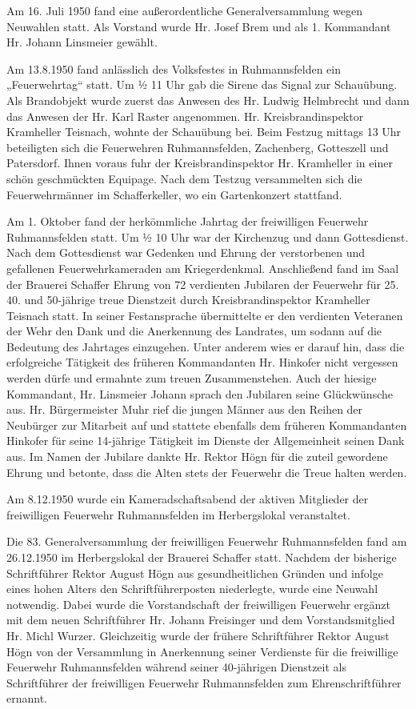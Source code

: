 \documentclass[12pt,a4paper]{book}
\begin{document}
Am 16. Juli 1950 fand eine außerordentliche Generalversammlung wegen Neuwahlen
statt. Als Vorstand wurde Hr. Josef Brem und als 1. Kommandant Hr. Johann
Linsmeier gewählt.

Am 13.8.1950 fand anlässlich des Volksfestes in Ruhmannsfelden ein
„Feuerwehrtag“ statt. Um ½ 11 Uhr gab die Sirene das Signal zur Schauübung. Als
Brandobjekt wurde zuerst das Anwesen des Hr. Ludwig Helmbrecht und dann das
Anwesen der Hr. Karl Raster angenommen. Hr. Kreisbrandinspektor Kramheller
Teisnach, wohnte der Schauübung bei. Beim Festzug mittags 13 Uhr beteiligten
sich die Feuerwehren Ruhmannsfelden, Zachenberg, Gotteszell und Patersdorf.
Ihnen voraus fuhr der Kreisbrandinspektor Hr. Kramheller in einer schön
geschmückten Equipage. Nach dem Testzug versammelten sich die Feuerwehrmänner im
Schafferkeller, wo ein Gartenkonzert stattfand.

Am 1. Oktober fand der herkömmliche Jahrtag der freiwilligen Feuerwehr
Ruhmannsfelden statt. Um ½ 10 Uhr war der Kirchenzug und dann Gottesdienst. Nach
dem Gottesdienst war Gedenken und Ehrung der verstorbenen und gefallenen
Feuerwehrkameraden am Kriegerdenkmal. Anschließend fand im Saal der Brauerei
Schaffer Ehrung von 72 verdienten Jubilaren der Feuerwehr für 25. 40. und
50-jährige treue Dienstzeit durch Kreisbrandinspektor Kramheller Teisnach statt.
In seiner Festansprache übermittelte er den verdienten Veteranen der Wehr den
Dank und die Anerkennung des Landrates, um sodann auf die Bedeutung des
Jahrtages einzugehen. Unter anderem wies er darauf hin, dass die erfolgreiche
Tätigkeit des früheren Kommandanten Hr. Hinkofer nicht vergessen werden dürfe
und ermahnte zum treuen Zusammenstehen. Auch der hiesige Kommandant, Hr.
Linsmeier Johann sprach den Jubilaren seine Glückwünsche aus. Hr. Bürgermeister
Muhr rief die jungen Männer aus den Reihen der Neubürger zur Mitarbeit auf und
stattete ebenfalls dem früheren Kommandanten Hinkofer für seine 14-jährige
Tätigkeit im Dienste der Allgemeinheit seinen Dank aus. Im Namen der Jubilare
dankte Hr. Rektor Högn für die zuteil gewordene Ehrung und betonte, dass die
Alten stets der Feuerwehr die Treue halten werden.

Am 8.12.1950 wurde ein Kameradschaftsabend der aktiven Mitglieder der
freiwilligen Feuerwehr Ruhmannsfelden im Herbergslokal veranstaltet.

Die 83. Generalversammlung der freiwilligen Feuerwehr Ruhmannsfelden fand am
26.12.1950 im Herbergslokal der Brauerei Schaffer statt. Nachdem der bisherige
Schriftführer Rektor August Högn aus gesundheitlichen Gründen und infolge eines
hohen Alters den Schriftführerposten niederlegte, wurde eine Neuwahl notwendig.
Dabei wurde die Vorstandschaft der freiwilligen Feuerwehr ergänzt mit dem neuen
Schriftführer Hr. Johann Freisinger und dem Vorstandsmitglied Hr. Michl Wurzer.
Gleichzeitig wurde der frühere Schriftführer Rektor August Högn von der
Versammlung in Anerkennung seiner Verdienste für die freiwillige Feuerwehr
Ruhmannsfelden während seiner 40-jährigen Dienstzeit als Schriftführer der
freiwilligen Feuerwehr Ruhmannsfelden zum Ehrenschriftführer ernannt.
\end{document}
